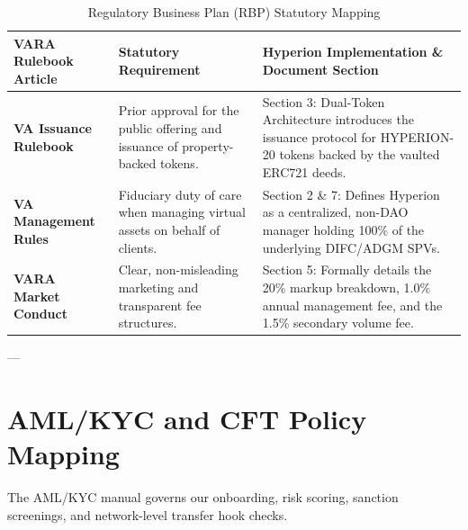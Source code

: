 \documentclass[11pt,a4paper]{article}
\begin{document}
\begin{table}[h!]
\centering
\begin{tabularx}{\textwidth}{l p{5cm} X}
\toprule
\textbf{VARA Rulebook Article} & \textbf{Statutory Requirement} & \textbf{Hyperion Implementation \& Document Section} \\
\midrule
\textbf{VA Issuance Rulebook} & Prior approval for the public offering and issuance of property-backed tokens. & Section 3: Dual-Token Architecture introduces the issuance protocol for HYPERION-20 tokens backed by the vaulted ERC721 deeds. \\
\midrule
\textbf{VA Management Rules} & Fiduciary duty of care when managing virtual assets on behalf of clients. & Section 2 \& 7: Defines Hyperion as a centralized, non-DAO manager holding 100\% of the underlying DIFC/ADGM SPVs. \\
\midrule
\textbf{VARA Market Conduct} & Clear, non-misleading marketing and transparent fee structures. & Section 5: Formally details the 20\% markup breakdown, 1.0\% annual management fee, and the 1.5\% secondary volume fee. \\
\bottomrule
\end{tabularx}
\caption{Regulatory Business Plan (RBP) Statutory Mapping}
\end{table}

---

\section{AML/KYC and CFT Policy Mapping}
The AML/KYC manual governs our onboarding, risk scoring, sanction screenings, and network-level transfer hook checks.
\par\vspace{10pt}
\end{document}
